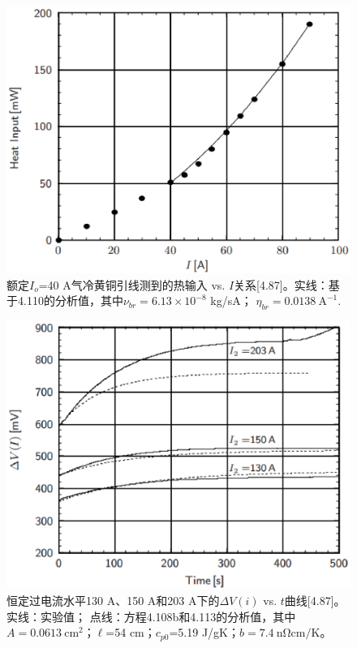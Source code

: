\begin{figure}[htbp]
	\centering
	\includegraphics[scale=0.6]{chpt4/figs/fig4.25.eps}
	\caption{额定$I_o$=40 A气冷黄铜引线测到的热输入 vs. $I$关系[4.87]。实线：基于4.110的分析值，其中$\nu_{br}=6.13\times 10^{-8}$ kg/sA；
		$\eta_{br}=0.0138\ \mathrm{A^{-1}}$.}
\end{figure}

\begin{figure}[htbp]
	\centering
	\includegraphics[scale=0.6]{chpt4/figs/fig4.26.eps}
	\caption{恒定过电流水平130 A、150 A和203 A下的$\Delta V(i)$ vs. $t$曲线[4.87]。实线：实验值；
		点线：方程4.108b和4.113的分析值，其中$A=0.0613\ \mathrm{cm^2}$；$\ell$=54 cm；$c_{p0}$=5.19 J/gK；$b=7.4\ \mathrm{n \Omega cm/K}$。}
\end{figure}


